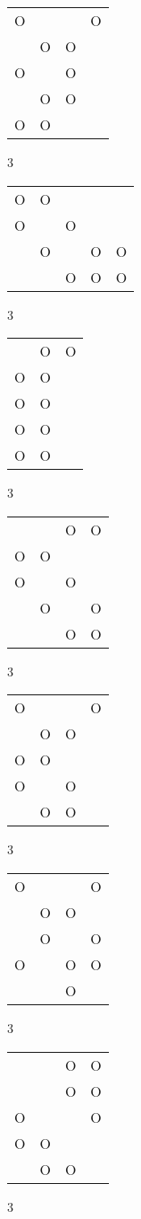 \begin{tabular}{|m{0.2cm}m{0.2cm}m{0.2cm}m{0.2cm}|}\hline
O& & &O\\
 &O&O& \\
O& &O& \\
 &O&O& \\
O&O& & \\
\hline\end{tabular}3
\begin{tabular}{|m{0.2cm}m{0.2cm}m{0.2cm}m{0.2cm}m{0.2cm}|}\hline
O&O& & & \\
O& &O& & \\
 &O& &O&O\\
 & &O&O&O\\
\hline\end{tabular}3
\begin{tabular}{|m{0.2cm}m{0.2cm}m{0.2cm}|}\hline
 &O&O\\
O&O& \\
O&O& \\
O&O& \\
O&O& \\
\hline\end{tabular}3
\begin{tabular}{|m{0.2cm}m{0.2cm}m{0.2cm}m{0.2cm}|}\hline
 & &O&O\\
O&O& & \\
O& &O& \\
 &O& &O\\
 & &O&O\\
\hline\end{tabular}3
\begin{tabular}{|m{0.2cm}m{0.2cm}m{0.2cm}m{0.2cm}|}\hline
O& & &O\\
 &O&O& \\
O&O& & \\
O& &O& \\
 &O&O& \\
\hline\end{tabular}3
\begin{tabular}{|m{0.2cm}m{0.2cm}m{0.2cm}m{0.2cm}|}\hline
O& & &O\\
 &O&O& \\
 &O& &O\\
O& &O&O\\
 & &O& \\
\hline\end{tabular}3
\begin{tabular}{|m{0.2cm}m{0.2cm}m{0.2cm}m{0.2cm}|}\hline
 & &O&O\\
 & &O&O\\
O& & &O\\
O&O& & \\
 &O&O& \\
\hline\end{tabular}3
